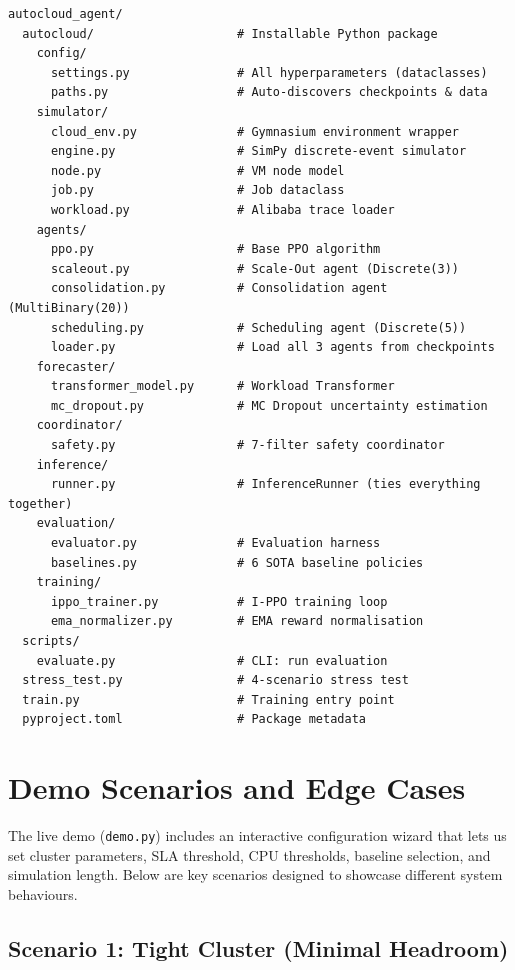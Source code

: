 \documentclass[11pt,a4paper]{article}
\begin{document}
\begin{lstlisting}
autocloud_agent/
  autocloud/                    # Installable Python package
    config/
      settings.py               # All hyperparameters (dataclasses)
      paths.py                  # Auto-discovers checkpoints & data
    simulator/
      cloud_env.py              # Gymnasium environment wrapper
      engine.py                 # SimPy discrete-event simulator
      node.py                   # VM node model
      job.py                    # Job dataclass
      workload.py               # Alibaba trace loader
    agents/
      ppo.py                    # Base PPO algorithm
      scaleout.py               # Scale-Out agent (Discrete(3))
      consolidation.py          # Consolidation agent (MultiBinary(20))
      scheduling.py             # Scheduling agent (Discrete(5))
      loader.py                 # Load all 3 agents from checkpoints
    forecaster/
      transformer_model.py      # Workload Transformer
      mc_dropout.py             # MC Dropout uncertainty estimation
    coordinator/
      safety.py                 # 7-filter safety coordinator
    inference/
      runner.py                 # InferenceRunner (ties everything together)
    evaluation/
      evaluator.py              # Evaluation harness
      baselines.py              # 6 SOTA baseline policies
    training/
      ippo_trainer.py           # I-PPO training loop
      ema_normalizer.py         # EMA reward normalisation
  scripts/
    evaluate.py                 # CLI: run evaluation
  stress_test.py                # 4-scenario stress test
  train.py                      # Training entry point
  pyproject.toml                # Package metadata
\end{lstlisting}


\section{Demo Scenarios and Edge Cases}\label{sec:demo}


The live demo (\texttt{demo.py}) includes an interactive configuration wizard
that lets us set cluster parameters, SLA threshold, CPU thresholds, baseline
selection, and simulation length. Below are key scenarios designed to
showcase different system behaviours.

\subsection{Scenario 1: Tight Cluster (Minimal Headroom)}
\end{document}

